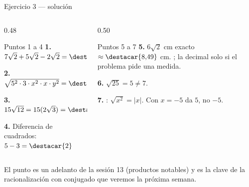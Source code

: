 \documentclass[aspectratio=169,10pt]{beamer}
\begin{document}
\begin{frame}{Ejercicio 3 — solución}
  \scriptsize
  \begin{columns}[T,onlytextwidth]
    \begin{column}{0.48\textwidth}
      \begin{block}{Puntos 1 a 4}
        \tiny
        \textbf{1.} $7\sqrt2 + 5\sqrt2 - 2\sqrt2 = \destacar{10\sqrt{2}}$

        \vspace{0.06cm}
        \textbf{2.} $\sqrt{5^2\cdot 3\cdot x^2\cdot x\cdot y^2}
        = \destacar{5xy\sqrt{3x}}$

        \vspace{0.06cm}
        \textbf{3.} $15\sqrt{12} = 15(2\sqrt3) = \destacar{30\sqrt{3}}$

        \vspace{0.06cm}
        \textbf{4.} Diferencia de cuadrados: $5 - 3 = \destacar{2}$
      \end{block}
    \end{column}
    \begin{column}{0.50\textwidth}
      \begin{alertblock}{Puntos 5 a 7}
        \tiny
        \textbf{5.} $6\sqrt{2}$ cm exacto $\approx \destacar{8{,}49}$ cm.
        ; la decimal solo si el
        problema pide una medida.

        \vspace{0.06cm}
        \textbf{6.} $\sqrt{25} = 5 \neq 7$. 

        \vspace{0.06cm}
        \textbf{7.} : $\sqrt{x^2} = |x|$. Con $x=-5$ da $5$, no
        $-5$.
      \end{alertblock}
    \end{column}
  \end{columns}

  \vspace{0.05cm}
  {\tiny\color{uniGris} El punto  es un adelanto de la sesión 13
  (productos notables) y es la clave de la racionalización con conjugado que
  veremos la próxima semana.}
\end{frame}
\end{document}
